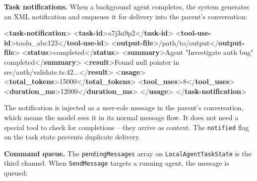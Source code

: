 \documentclass[
  english,
  11pt,
  letterpaper,
]{book}
\newenvironment{Shaded}{\begin{snugshade}}{\end{snugshade}}
\newcommand{\KeywordTok}[1]{\textcolor[rgb]{0.00,0.23,0.31}{\textbf{#1}}}
\newcommand{\NormalTok}[1]{\textcolor[rgb]{0.00,0.23,0.31}{#1}}
\begin{document}
\textbf{Task notifications.} When a background agent completes, the
system generates an XML notification and enqueues it for delivery into
the parent's conversation:

\begin{Shaded}
\begin{Highlighting}[]
\NormalTok{\textless{}}\KeywordTok{task{-}notification}\NormalTok{\textgreater{}}
\NormalTok{  \textless{}}\KeywordTok{task{-}id}\NormalTok{\textgreater{}a7j3n9p2\textless{}/}\KeywordTok{task{-}id}\NormalTok{\textgreater{}}
\NormalTok{  \textless{}}\KeywordTok{tool{-}use{-}id}\NormalTok{\textgreater{}toolu\_abc123\textless{}/}\KeywordTok{tool{-}use{-}id}\NormalTok{\textgreater{}}
\NormalTok{  \textless{}}\KeywordTok{output{-}file}\NormalTok{\textgreater{}/path/to/output\textless{}/}\KeywordTok{output{-}file}\NormalTok{\textgreater{}}
\NormalTok{  \textless{}}\KeywordTok{status}\NormalTok{\textgreater{}completed\textless{}/}\KeywordTok{status}\NormalTok{\textgreater{}}
\NormalTok{  \textless{}}\KeywordTok{summary}\NormalTok{\textgreater{}Agent "Investigate auth bug" completed\textless{}/}\KeywordTok{summary}\NormalTok{\textgreater{}}
\NormalTok{  \textless{}}\KeywordTok{result}\NormalTok{\textgreater{}Found null pointer in src/auth/validate.ts:42...\textless{}/}\KeywordTok{result}\NormalTok{\textgreater{}}
\NormalTok{  \textless{}}\KeywordTok{usage}\NormalTok{\textgreater{}}
\NormalTok{    \textless{}}\KeywordTok{total\_tokens}\NormalTok{\textgreater{}15000\textless{}/}\KeywordTok{total\_tokens}\NormalTok{\textgreater{}}
\NormalTok{    \textless{}}\KeywordTok{tool\_uses}\NormalTok{\textgreater{}8\textless{}/}\KeywordTok{tool\_uses}\NormalTok{\textgreater{}}
\NormalTok{    \textless{}}\KeywordTok{duration\_ms}\NormalTok{\textgreater{}12000\textless{}/}\KeywordTok{duration\_ms}\NormalTok{\textgreater{}}
\NormalTok{  \textless{}/}\KeywordTok{usage}\NormalTok{\textgreater{}}
\NormalTok{\textless{}/}\KeywordTok{task{-}notification}\NormalTok{\textgreater{}}
\end{Highlighting}
\end{Shaded}

The notification is injected as a user-role message in the parent's
conversation, which means the model sees it in its normal message flow.
It does not need a special tool to check for completions -- they arrive
as context. The \texttt{notified} flag on the task state prevents
duplicate delivery.

\textbf{Command queue.} The \texttt{pendingMessages} array on
\texttt{LocalAgentTaskState} is the third channel. When
\texttt{SendMessage} targets a running agent, the message is queued:
\end{document}
